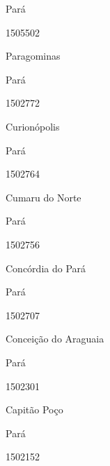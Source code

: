 \documentclass[
  letterpaper,
]{report}
\begin{document}
\n      

Pará

\n      

1505502

\n      

Paragominas

\n    

\n    

\n      

Pará

\n      

1502772

\n      

Curionópolis

\n    

\n    

\n      

Pará

\n      

1502764

\n      

Cumaru do Norte

\n    

\n    

\n      

Pará

\n      

1502756

\n      

Concórdia do Pará

\n    

\n    

\n      

Pará

\n      

1502707

\n      

Conceição do Araguaia

\n    

\n    

\n      

Pará

\n      

1502301

\n      

Capitão Poço

\n    

\n    

\n      

Pará

\n      

1502152

\n      
\end{document}
